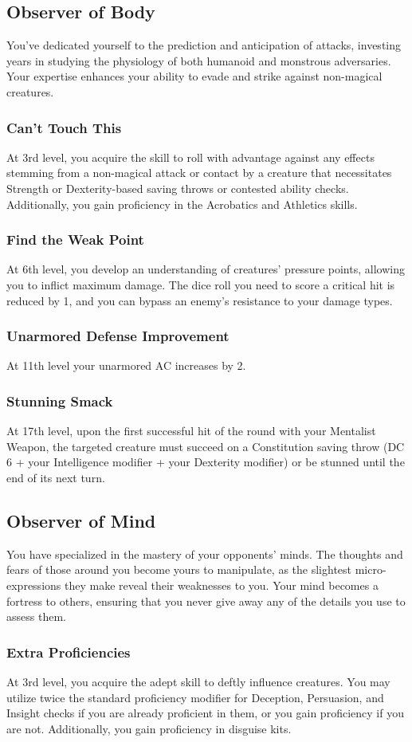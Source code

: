 \subsection{Observer of Body}
You've dedicated yourself to the prediction and anticipation of attacks, investing years in studying the physiology of both humanoid and monstrous adversaries. Your expertise enhances your ability to evade and strike against non-magical creatures.
\subsubsection{Can't Touch This}
At 3rd level, you acquire the skill to roll with advantage against any effects stemming from a non-magical attack or contact by a creature that necessitates Strength or Dexterity-based saving throws or contested ability checks. Additionally, you gain proficiency in the Acrobatics and Athletics skills.
\subsubsection{Find the Weak Point}
At 6th level, you develop an understanding of creatures' pressure points, allowing you to inflict maximum damage. The dice roll you need to score a critical hit is reduced by 1, and you can bypass an enemy's resistance to your damage types.
\subsubsection{Unarmored Defense Improvement}
At 11th level your unarmored AC increases by 2.
\subsubsection{Stunning Smack}
At 17th level, upon the first successful hit of the round with your Mentalist Weapon, the targeted creature must succeed on a Constitution saving throw (DC 6 + your Intelligence modifier + your Dexterity modifier) or be stunned until the end of its next turn.
\subsection{Observer of Mind}
You have specialized in the mastery of your opponents' minds. The thoughts and fears of those around you become yours to manipulate, as the slightest micro-expressions they make reveal their weaknesses to you. Your mind becomes a fortress to others, ensuring that you never give away any of the details you use to assess them.
\subsubsection{Extra Proficiencies}
At 3rd level, you acquire the adept skill to deftly influence creatures. You may utilize twice the standard proficiency modifier for Deception, Persuasion, and Insight checks if you are already proficient in them, or you gain proficiency if you are not. Additionally, you gain proficiency in disguise kits.
